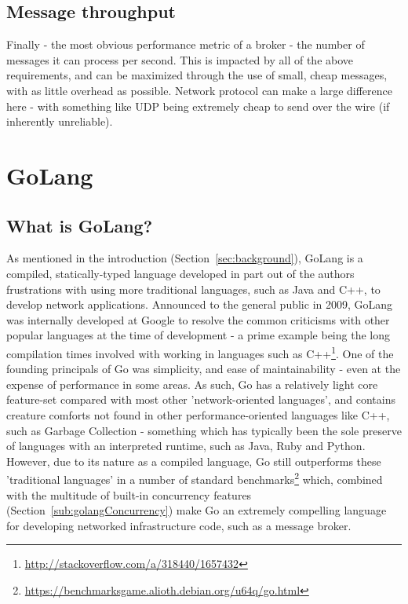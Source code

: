 \subsection{Message throughput}
\label{sub:Message throughput}

Finally - the most obvious performance metric of a broker - the number of
messages it can process per second. This is impacted by all of the above
requirements, and can be maximized through the use of small, cheap messages,
with as little overhead as possible. Network protocol can make a large
difference here - with something like UDP being extremely cheap to send over the
wire (if inherently unreliable).

\section{GoLang}
\label{sec:GoLang}


\subsection{What is GoLang?}
\label{sub:What is GoLang?}

As mentioned in the introduction (Section~\ref{sec:background}), GoLang is a
compiled, statically-typed language developed in part out of the authors
frustrations with using more traditional languages, such as Java and C++, to
develop network applications\cite{kenThompsonInterview}. Announced to the
general public in 2009, GoLang was internally developed at Google to resolve the
common criticisms with other popular languages at the time of development - a
prime example being the long compilation times involved with working in
languages such as C++\footnote{\url{http://stackoverflow.com/a/318440/1657432}}.
One of the founding principals of Go was simplicity, and ease of maintainability
\cite{Less is exponentially more} - even at the expense of performance in some
areas. As such, Go has a relatively light core feature-set compared with most
other 'network-oriented languages', and contains creature comforts not found in
other performance-oriented languages like C++, such as Garbage Collection -
something which has typically been the sole preserve of languages with an
interpreted runtime, such as Java, Ruby and Python. However, due to its nature
as a compiled language, Go still outperforms these 'traditional languages' in a
number of standard
benchmarks\footnote{\url{https://benchmarksgame.alioth.debian.org/u64q/go.html}}
which, combined with the multitude of built-in concurrency features
(Section~\ref{sub:golangConcurrency}) make Go an extremely compelling language
for developing networked infrastructure code, such as a message broker.

